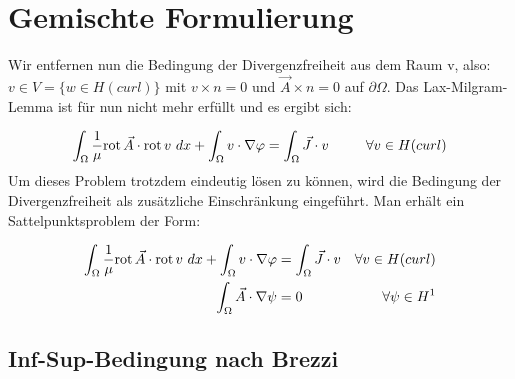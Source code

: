 \section{Gemischte Formulierung}
Wir entfernen nun die Bedingung der Divergenzfreiheit aus dem Raum v, also: $v\in V = \{w \in H(curl)\}$ mit $v\times n = 0$ und $\vec{A}\times n = 0$ auf $\partial\Omega$. Das Lax-Milgram-Lemma ist f\"ur nun nicht mehr erf\"ullt und es ergibt sich: 
\par
\begin{equation}
	\int_\Omega \frac{1}{\mu}\mathrm{rot}\, \vec{A} \cdot \mathrm{rot}\, v ~dx + \int_\Omega v\cdot\nabla\varphi = \int_\Omega \vec{J}\cdot v ~~~~~~~~\forall v \in H(curl)
\end{equation}
Um dieses Problem trotzdem eindeutig l\"osen zu k\"onnen, wird die Bedingung der Divergenzfreiheit als zus\"atzliche Einschr\"ankung eingef\"uhrt. Man erh\"alt ein Sattelpunktsproblem der Form:
\par
\begin{align}
	\int_\Omega \frac{1}{\mu}\mathrm{rot}\, \vec{A} \cdot \mathrm{rot}\, v ~dx + \int_\Omega v\cdot\nabla\varphi & = \int_\Omega \vec{J}\cdot v &\forall v \in H(curl) \\
	\int_\Omega \vec{A}\cdot \nabla\psi &= 0 &\forall\psi\in H^1
\end{align}


\subsection{Inf-Sup-Bedingung nach Brezzi}

